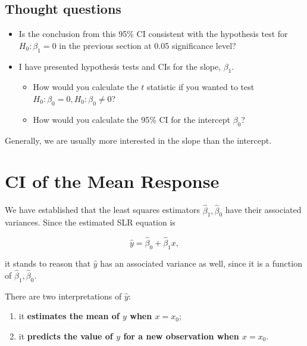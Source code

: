\documentclass[
]{book}
\providecommand{\tightlist}{%
  \setlength{\itemsep}{0pt}\setlength{\parskip}{0pt}}
\begin{document}
\subsection{Thought questions}\label{thought-questions}

\begin{itemize}
\item
  Is the conclusion from this 95\% CI consistent with the hypothesis test for \(H_0: \beta_1 = 0\) in the previous section at 0.05 significance level?
\item
  I have presented hypothesis tests and CIs for the slope, \(\beta_1\).

  \begin{itemize}
  \item
    How would you calculate the \(t\) statistic if you wanted to test \(H_0: \beta_0 = 0, H_0: \beta_0 \neq 0\)?
  \item
    How would you calculate the 95\% CI for the intercept \(\beta_0\)?
  \end{itemize}
\end{itemize}

Generally, we are usually more interested in the slope than the intercept.

\section{CI of the Mean Response}\label{ci-of-the-mean-response}

We have established that the least squares estimators \(\hat{\beta}_1,\hat{\beta}_0\) have their associated variances. Since the estimated SLR equation is

\begin{equation} 
\hat{y}=\hat{\beta}_0+\hat{\beta}_1 x,
\label{eq:4fitted}
\end{equation}

it stands to reason that \(\hat{y}\) has an associated variance as well, since it is a function of \(\hat{\beta}_1,\hat{\beta}_0\).

There are two interpretations of \(\hat{y}\):

\begin{enumerate}
\def\labelenumi{\arabic{enumi}.}
\tightlist
\item
  it \textbf{estimates the mean of \(y\) when \(x=x_0\)};
\item
  it \textbf{predicts the value of \(y\) for a new observation when \(x=x_0\)}.
\end{enumerate}
\end{document}
